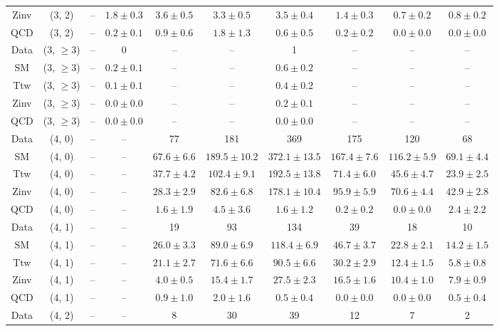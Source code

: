 \begin{table}[h!]
{\begin{tabular}{cccccccccc}
	Zinv & (3, 2) & -- & $1.8\pm 0.3$ & $3.6\pm 0.5$ & $3.3\pm 0.5$ & $3.5\pm 0.4$ & $1.4\pm 0.3$ & $0.7\pm 0.2$ & $0.8\pm 0.2$ \\[0.5ex] 
	QCD & (3, 2) & -- & $0.2\pm 0.1$ & $0.9\pm 0.6$ & $1.8\pm 1.3$ & $0.6\pm 0.5$ & $0.2\pm 0.2$ & $0.0\pm 0.0$ & $0.0\pm 0.0$ \\[0.5ex] 
	Data & (3, $\ge3$) & -- & 0 & -- & -- & 1 & -- & -- & -- \\[0.5ex] 
	SM & (3, $\ge3$) & -- & $0.2\pm 0.1$ & -- & -- & $0.6\pm 0.2$ & -- & -- & -- \\[0.5ex] 
	Ttw & (3, $\ge3$) & -- & $0.1\pm 0.1$ & -- & -- & $0.4\pm 0.2$ & -- & -- & -- \\[0.5ex] 
	Zinv & (3, $\ge3$) & -- & $0.0\pm 0.0$ & -- & -- & $0.2\pm 0.1$ & -- & -- & -- \\[0.5ex] 
	QCD & (3, $\ge3$) & -- & $0.0\pm 0.0$ & -- & -- & $0.0\pm 0.0$ & -- & -- & -- \\[0.5ex] 
	Data & (4, 0) & -- & -- & 77 & 181 & 369 & 175 & 120 & 68 \\[0.5ex] 
	SM & (4, 0) & -- & -- & $67.6\pm 6.6$ & $189.5\pm 10.2$ & $372.1\pm 13.5$ & $167.4\pm 7.6$ & $116.2\pm 5.9$ & $69.1\pm 4.4$ \\[0.5ex] 
	Ttw & (4, 0) & -- & -- & $37.7\pm 4.2$ & $102.4\pm 9.1$ & $192.5\pm 13.8$ & $71.4\pm 6.0$ & $45.6\pm 4.7$ & $23.9\pm 2.5$ \\[0.5ex] 
	Zinv & (4, 0) & -- & -- & $28.3\pm 2.9$ & $82.6\pm 6.8$ & $178.1\pm 10.4$ & $95.9\pm 5.9$ & $70.6\pm 4.4$ & $42.9\pm 2.8$ \\[0.5ex] 
	QCD & (4, 0) & -- & -- & $1.6\pm 1.9$ & $4.5\pm 3.6$ & $1.6\pm 1.2$ & $0.2\pm 0.2$ & $0.0\pm 0.0$ & $2.4\pm 2.2$ \\[0.5ex] 
	Data & (4, 1) & -- & -- & 19 & 93 & 134 & 39 & 18 & 10 \\[0.5ex] 
	SM & (4, 1) & -- & -- & $26.0\pm 3.3$ & $89.0\pm 6.9$ & $118.4\pm 6.9$ & $46.7\pm 3.7$ & $22.8\pm 2.1$ & $14.2\pm 1.5$ \\[0.5ex] 
	Ttw & (4, 1) & -- & -- & $21.1\pm 2.7$ & $71.6\pm 6.6$ & $90.5\pm 6.6$ & $30.2\pm 2.9$ & $12.4\pm 1.5$ & $5.8\pm 0.8$ \\[0.5ex] 
	Zinv & (4, 1) & -- & -- & $4.0\pm 0.5$ & $15.4\pm 1.7$ & $27.5\pm 2.3$ & $16.5\pm 1.6$ & $10.4\pm 1.0$ & $7.9\pm 0.9$ \\[0.5ex] 
	QCD & (4, 1) & -- & -- & $0.9\pm 1.0$ & $2.0\pm 1.6$ & $0.5\pm 0.4$ & $0.0\pm 0.0$ & $0.0\pm 0.0$ & $0.5\pm 0.4$ \\[0.5ex] 
	Data & (4, 2) & -- & -- & 8 & 30 & 39 & 12 & 7 & 2 \\[0.5ex] 

\end{tabular}}
\end{table}
